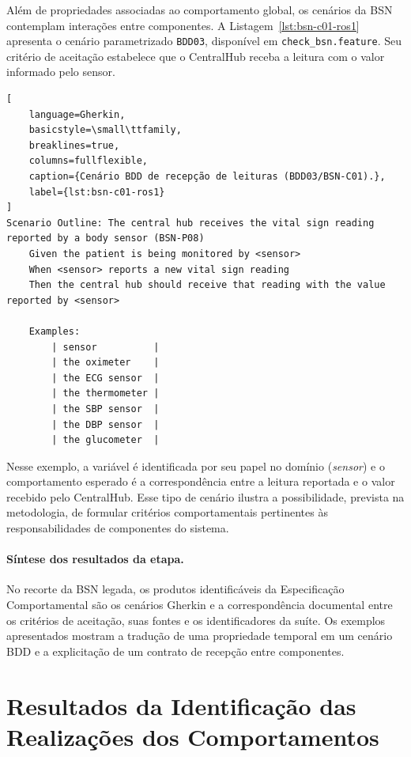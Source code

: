 Além de propriedades associadas ao comportamento global, os cenários da BSN contemplam interações entre componentes. A Listagem~\ref{lst:bsn-c01-ros1} apresenta o cenário parametrizado \texttt{BDD03}, disponível em \texttt{check\_bsn.feature}. Seu critério de aceitação estabelece que o CentralHub receba a leitura com o valor informado pelo sensor. 

\begin{lstlisting}[
    language=Gherkin,
    basicstyle=\small\ttfamily,
    breaklines=true,
    columns=fullflexible,
    caption={Cenário BDD de recepção de leituras (BDD03/BSN-C01).},
    label={lst:bsn-c01-ros1}
]
Scenario Outline: The central hub receives the vital sign reading reported by a body sensor (BSN-P08)
    Given the patient is being monitored by <sensor>
    When <sensor> reports a new vital sign reading
    Then the central hub should receive that reading with the value reported by <sensor>

    Examples:
        | sensor          |
        | the oximeter    |
        | the ECG sensor  |
        | the thermometer |
        | the SBP sensor  |
        | the DBP sensor  |
        | the glucometer  |
\end{lstlisting}

Nesse exemplo, a variável é identificada por seu papel no domínio (\textit{sensor}) e o comportamento esperado é a correspondência entre a leitura reportada e o valor recebido pelo CentralHub. Esse tipo de cenário ilustra a possibilidade, prevista na metodologia, de formular critérios comportamentais pertinentes às responsabilidades de componentes do sistema.

\paragraph{Síntese dos resultados da etapa.}

No recorte da BSN legada, os produtos identificáveis da Especificação Comportamental são os cenários Gherkin e a correspondência documental entre os critérios de aceitação, suas fontes e os identificadores da suíte. Os exemplos apresentados mostram a tradução de uma propriedade temporal em um cenário BDD e a explicitação de um contrato de recepção entre componentes.

\section{Resultados da Identificação das Realizações dos Comportamentos}
\label{sec:resultados-identificacao-realizacoes}

